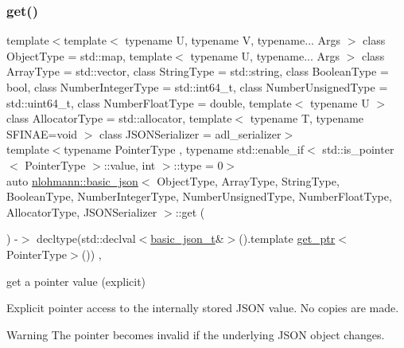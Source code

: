 \subsubsection{\texorpdfstring{get()}{get()}\hspace{0.1cm}{\footnotesize\ttfamily [5/6]}}
{\footnotesize\ttfamily template$<$template$<$ typename U, typename V, typename... Args $>$ class Object\+Type = std\+::map, template$<$ typename U, typename... Args $>$ class Array\+Type = std\+::vector, class String\+Type  = std\+::string, class Boolean\+Type  = bool, class Number\+Integer\+Type  = std\+::int64\+\_\+t, class Number\+Unsigned\+Type  = std\+::uint64\+\_\+t, class Number\+Float\+Type  = double, template$<$ typename U $>$ class Allocator\+Type = std\+::allocator, template$<$ typename T, typename S\+F\+I\+N\+A\+E=void $>$ class J\+S\+O\+N\+Serializer = adl\+\_\+serializer$>$ \\
template$<$typename Pointer\+Type , typename std\+::enable\+\_\+if$<$ std\+::is\+\_\+pointer$<$ Pointer\+Type $>$\+::value, int $>$\+::type  = 0$>$ \\
auto \mbox{\hyperlink{classnlohmann_1_1basic__json}{nlohmann\+::basic\+\_\+json}}$<$ Object\+Type, Array\+Type, String\+Type, Boolean\+Type, Number\+Integer\+Type, Number\+Unsigned\+Type, Number\+Float\+Type, Allocator\+Type, J\+S\+O\+N\+Serializer $>$\+::get (\begin{DoxyParamCaption}{ }\end{DoxyParamCaption}) -\/$>$ decltype(std\+::declval$<$\mbox{\hyperlink{classnlohmann_1_1basic__json_afff7860310ae69f29f8158a77ec0ef13}{basic\+\_\+json\+\_\+t}}\&$>$().template \mbox{\hyperlink{classnlohmann_1_1basic__json_afb283ec92e108f9561a86427a609b87c}{get\+\_\+ptr}}$<$Pointer\+Type$>$())
    \hspace{0.3cm}{\ttfamily [inline]}, {\ttfamily [noexcept]}}



get a pointer value (explicit) 

Explicit pointer access to the internally stored J\+S\+ON value. No copies are made.

\begin{DoxyWarning}{Warning}
The pointer becomes invalid if the underlying J\+S\+ON object changes.
\end{DoxyWarning}

